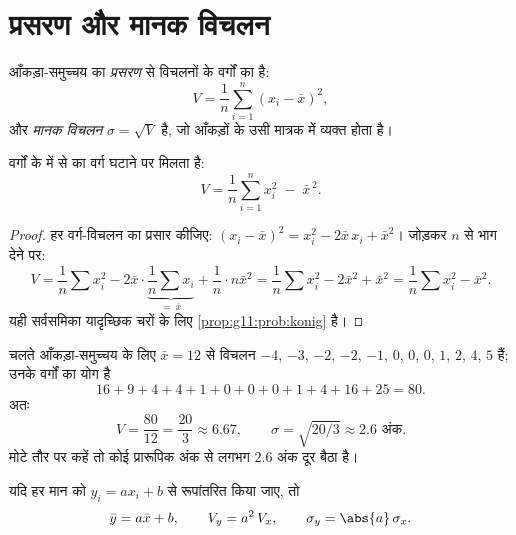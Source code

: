 \section{प्रसरण और मानक विचलन}

\begin{definition}\label{def:g11:stat:variance}
आँकड़ा-समुच्चय का \emph{प्रसरण}  से विचलनों के वर्गों का
 है:
\[
V = \frac{1}{n}\sum_{i=1}^{n} (x_i - \bar x)^2,
\]
और \emph{मानक विचलन} $\sigma = \sqrt{V}$ है, जो आँकड़ों के उसी मात्रक में
व्यक्त होता है।
\end{definition}

\begin{proposition}[संक्षिप्त सूत्र]\label{prop:g11:stat:shortcut}
 वर्गों के  में से  का वर्ग घटाने पर मिलता है:
\[
V = \frac{1}{n}\sum_{i=1}^{n} x_i^2 \;-\; \bar x^{\,2}.
\]
\end{proposition}

\begin{proof}
हर वर्ग-विचलन का प्रसार कीजिए: $(x_i - \bar x)^2 = x_i^2 - 2\bar x\, x_i + \bar x^2$। जोड़कर $n$ से भाग देने पर:
\[
V = \frac1n \sum x_i^2 - 2\bar x \cdot \underbrace{\frac1n \sum
x_i}_{=\ \bar x} + \frac1n \cdot n\bar x^2
= \frac1n\sum x_i^2 - 2\bar x^2 + \bar x^2
= \frac1n\sum x_i^2 - \bar x^2 .
\]
यही सर्वसमिका यादृच्छिक चरों के लिए \cref{prop:g11:prob:konig} है।
\end{proof}

\begin{example}\label{ex:g11:stat:variance}
चलते आँकड़ा-समुच्चय के लिए $\bar x = 12$ से विचलन $-4$, $-3$, $-2$, $-2$, $-1$, $0$,
$0$, $0$, $1$, $2$, $4$, $5$ हैं; उनके वर्गों का योग है
\[
16 + 9 + 4 + 4 + 1 + 0 + 0 + 0 + 1 + 4 + 16 + 25 = 80 .
\]
अतः
\[
V = \frac{80}{12} = \frac{20}{3} \approx 6.67,
\qquad
\sigma = \sqrt{20/3} \approx 2.6 \text{ अंक}.
\]
मोटे तौर पर कहें तो कोई प्रारूपिक अंक  से लगभग $2.6$ अंक दूर बैठा है।
\end{example}

\begin{proposition}[मात्रक बदलना]\label{prop:g11:stat:affine}
यदि हर मान को $y_i = a x_i + b$ से रूपांतरित किया जाए, तो
\[
\bar y = a \bar x + b,
\qquad
V_y = a^2\, V_x,
\qquad
\sigma_y = \abs{a}\,\sigma_x .
\]
\end{proposition}

